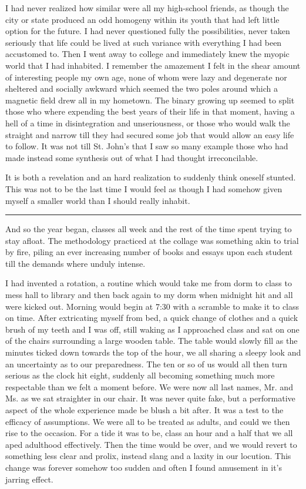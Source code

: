 \documentclass[ebook, 10pt, openright, onecolumn]{memoir}
\newcommand*\starbreak{\fancybreak*{\Large{* * *}}}
\begin{document}
I had never realized how similar were all my high-school friends, as though the
city or state produced an odd homogeny within its youth that had left little
option for the future.  I had never questioned fully the possibilities, never
taken seriously that life could be lived at such variance with everything I had
been accustomed to.  Then I went away to college and immediately knew the myopic
world that I had inhabited. I remember the amazement I felt in the shear amount
of interesting people my own age, none of whom were lazy and degenerate nor
sheltered and socially awkward which seemed the two poles around which a
magnetic field drew all in my hometown.  The binary growing up seemed to split
those who where expending the best years of their life in that moment, having a
hell of a time in disintegration and unseriousness, or those who would walk the
straight and narrow till they had secured some job that would allow an easy life
to follow.  It was not till St. John's that I saw so many example those who had
made instead some synthesis out of what I had thought irreconcilable.

It is both a revelation and an hard realization to suddenly think oneself
stunted.  This was not to be the last time I would feel as though I had somehow
given myself a smaller world than I should really inhabit.


\starbreak

And so the year began, classes all week and the rest of the time spent trying to
stay afloat.  The methodology practiced at the collage was something akin to
trial by fire, piling an ever increasing number of books and essays upon each
student till the demands where unduly intense.  

I had invented a rotation, a routine which would take me from dorm to class to
mess hall to library and then back again to my dorm when midnight hit and all
were kicked out.  Morning would begin at 7:30 with a scramble to make it to
class on time.  After extricating myself from bed, a quick change of clothes and
a quick brush of my teeth and I was off, still waking as I approached class and
sat on one of the chairs surrounding a large wooden table.  The table would
slowly fill as the minutes ticked down towards the top of the hour, we all
sharing a sleepy look and an uncertainty as to our preparedness.  The ten or so
of us would all then turn serious as the clock hit eight, suddenly all becoming
something much more respectable than we felt a moment before.  We were now all
last names, Mr. and Ms. as we sat straighter in our chair.  It was never quite
fake, but a performative aspect of the whole experience made be blush a bit
after.  It was a test to the efficacy of assumptions.  We were all to be treated
as adults, and could we then rise to the occasion.  For a tide it was to be,
class an hour and a half that we all aped adulthood effectively.  Then the time
would be over, and we would revert to something less clear and prolix, instead
slang and a laxity in our locution.  This change was forever somehow too sudden
and often I found amusement in it's jarring effect.
\end{document}

